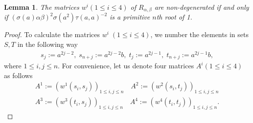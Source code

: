\documentclass[a4paper,11pt]{amsart}
\numberwithin{equation}{section}
\newtheorem{lemma}[theorem]{Lemma}
\begin{document}
\begin{lemma}\label{min}
The matrices $w^i(1\leq i\leq4)$ of $R_{\alpha,\beta}$ are non-degenerated if and only if $(\sigma(a) \alpha \beta)^2 \sigma(a^2) \tau(a,a)^{-2}$ is a primitive $n$th root of 1.
\end{lemma}
\begin{proof}
To calculate the matrices $w^{i}\;(1\leq i\leq4)$, we number the elements in sets $S,T$ in the following way
\begin{gather*}
s_j:=a^{2j-2},\;s_{n+j}:=a^{2j-2}b,\;t_j:=a^{2j-1},\;t_{n+j}:=a^{2j-1}b,
\end{gather*}
where $1 \leq i,j \leq n$. For convenience, let us denote four matrices $A^{i}(1\leq i\leq4)$ as follows
\begin{gather*}
A^1:=(w^1(s_i,s_j))_{1\leq i,j \leq n} \quad A^2:=(w^2(s_i,t_j))_{1\leq i,j \leq n}\\ A^3:=(w^3(t_i,s_j))_{1\leq i,j \leq n}\quad A^4:=(w^4(t_i,t_j))_{1\leq i,j \leq n}.
\end{gather*}


\end{proof}
\end{document}
